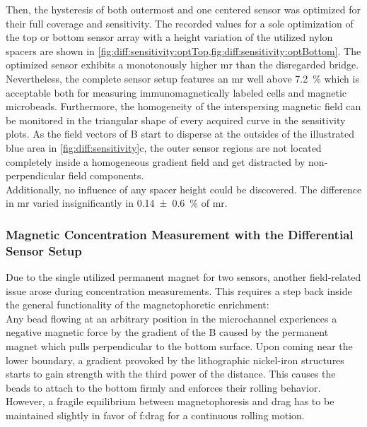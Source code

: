 Then, the hysteresis of both outermost and one centered sensor was optimized for their full coverage and sensitivity. The recorded values for a sole optimization of the top or bottom sensor array with a height variation of the utilized nylon spacers are shown in \cref{fig:diff:sensitivity:optTop,fig:diff:sensitivity:optBottom}. The optimized sensor exhibits a monotonously higher \gls{mr} than the disregarded bridge. Nevertheless, the complete sensor setup features an \gls{mr} well above \SI{7.2}{\percent} which is acceptable both for measuring immunomagnetically labeled cells and magnetic microbeads. Furthermore, the homogeneity of the interspersing magnetic field can be monitored in the triangular shape of every acquired curve in the sensitivity plots. As the field vectors of \gls{B} start to disperse at the outsides of the illustrated blue area in \cref{fig:diff:sensitivity}c, the outer sensor regions are not located completely inside a homogeneous gradient field and get distracted by non-perpendicular field components.\citet{lit:thes:helou} \\
Additionally, no influence of any spacer height could be discovered.  The difference in \gls{mr} varied insignificantly in \SI{0.14 +- 0.6}{\percent} of \gls{mr}.
\clearpage


\subsubsection{Magnetic Concentration Measurement with the Differential Sensor Setup}
Due to the single utilized permanent magnet for two sensors, another field-related issue arose during concentration measurements. This requires a step back inside the general functionality of the magnetophoretic enrichment:\\
Any bead flowing at an arbitrary position in the microchannel experiences a negative magnetic force by the gradient of the \acrlong{B} caused by the permanent magnet which pulls perpendicular to the bottom surface. Upon coming near the lower boundary, a gradient provoked by the lithographic nickel-iron structures starts to gain strength with the third power of the distance. This causes the beads to attach to the bottom firmly and enforces their rolling behavior. However, a fragile equilibrium between magnetophoresis and drag has to be maintained slightly in favor of \acrlong{f:drag} for a continuous rolling motion.

